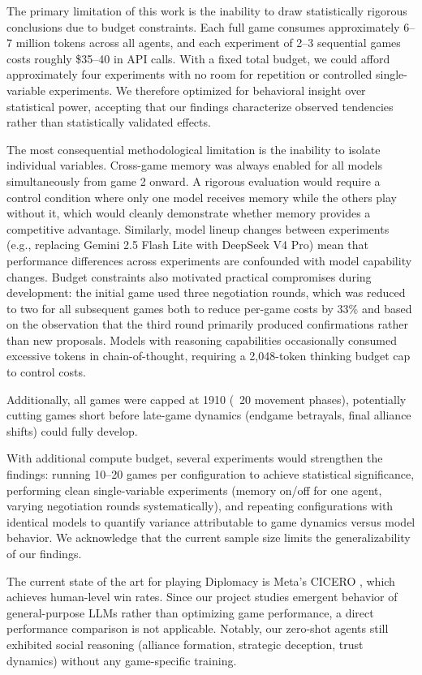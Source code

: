 \documentclass[a4paper,oneside,bibliography=totoc]{scrartcl}
\begin{document}
The primary limitation of this work is the inability to draw statistically rigorous conclusions due to budget constraints. Each full game consumes approximately 6--7 million tokens across all agents, and each experiment of 2--3 sequential games costs roughly \$35--40 in API calls. With a fixed total budget, we could afford approximately four experiments with no room for repetition or controlled single-variable experiments. We therefore optimized for behavioral insight over statistical power, accepting that our findings characterize observed tendencies rather than statistically validated effects.

The most consequential methodological limitation is the inability to isolate individual variables. Cross-game memory was always enabled for all models simultaneously from game 2 onward. A rigorous evaluation would require a control condition where only one model receives memory while the others play without it, which would cleanly demonstrate whether memory provides a competitive advantage. Similarly, model lineup changes between experiments (e.g., replacing Gemini 2.5 Flash Lite with DeepSeek V4 Pro) mean that performance differences across experiments are confounded with model capability changes. Budget constraints also motivated practical compromises during development: the initial game used three negotiation rounds, which was reduced to two for all subsequent games both to reduce per-game costs by 33\% and based on the observation that the third round primarily produced confirmations rather than new proposals. Models with reasoning capabilities occasionally consumed excessive tokens in chain-of-thought, requiring a 2,048-token thinking budget cap to control costs.

Additionally, all games were capped at 1910 (~20 movement phases), potentially cutting games short before late-game dynamics (endgame betrayals, final alliance shifts) could fully develop.

With additional compute budget, several experiments would strengthen the findings: running 10--20 games per configuration to achieve statistical significance, performing clean single-variable experiments (memory on/off for one agent, varying negotiation rounds systematically), and repeating configurations with identical models to quantify variance attributable to game dynamics versus model behavior. We acknowledge that the current sample size limits the generalizability of our findings.

The current state of the art for playing Diplomacy is Meta's CICERO \cite{meta2022cicero}, which achieves human-level win rates. Since our project studies emergent behavior of general-purpose LLMs rather than optimizing game performance, a direct performance comparison is not applicable. Notably, our zero-shot agents still exhibited social reasoning (alliance formation, strategic deception, trust dynamics) without any game-specific training.
\end{document}
